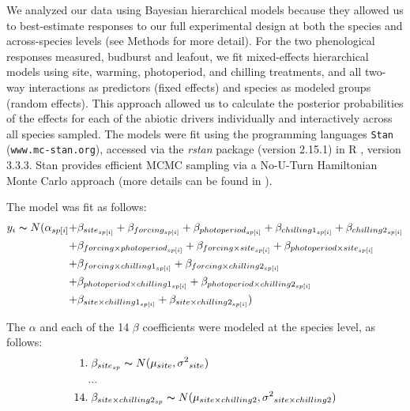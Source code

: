 \documentclass[11pt]{article}
\begin{document}
\noindent We analyzed our data using Bayesian hierarchical models because they allowed us to best-estimate responses to our full experimental design at both the species and across-species levels (see Methods for more detail). For the two phenological responses measured, budburst and leafout, we fit mixed-effects hierarchical models using site, warming, photoperiod, and chilling treatments, and all two-way interactions as predictors (fixed effects) and species as modeled groups (random effects). This approach allowed us to calculate the posterior probabilities of the effects for each of the abiotic drivers individually and interactively across all species sampled. The models were fit using the programming languages \texttt{Stan} \citep{Carpenter:2016aa}(\texttt{www.mc-stan.org}), accessed via the \textit{rstan} package (version 2.15.1) in R \citep{Rcore:2017}, version 3.3.3. Stan provides efficient MCMC sampling via a No-U-Turn Hamiltonian Monte Carlo approach (more details can be found in \citet{BDA,Carpenter:2016aa}).

The model was fit as follows:
\begin{align*}
y_i \thicksim N(\alpha_{sp[i]} +& \beta_{site_{sp[i]}} + \beta_{forcing_{sp[i]}} + \beta_{photoperiod_{sp[i]}} + \beta_{chilling1_{sp[i]}} + \beta_{chilling2_{sp[i]}}  \\
	+& \beta_{forcing \times photoperiod_{sp[i]}} + \beta_{forcing \times site_{sp[i]}} + \beta_{photoperiod \times site_{sp[i]}} \\
	+& \beta_{forcing  \times chilling1_{sp[i]}} + \beta_{forcing \times chilling2_{sp[i]}} \\
	+& \beta_{photoperiod \times chilling1_{sp[i]}} + \beta_{photoperiod \times chilling2_{sp[i]}} \\
	+& \beta_{site \times chilling1_{sp[i]}}  + \beta_{site \times chilling2_{sp[i]}} )
\end{align*}

\noindent The $\alpha$ and each of the 14 $\beta$ coefficients were modeled at the species level, as follows:
\begin{align*}
1.& \; \beta_{site_{sp}} \thicksim N(\mu_{site}, \sigma{^2}_{site}) \\
   &... \\
14.& \; \beta_{site \times chilling2_{sp}} \thicksim N(\mu_{site \times chilling2}, \sigma{^2}_{site \times chilling2})
\end{align*}
\end{document}
